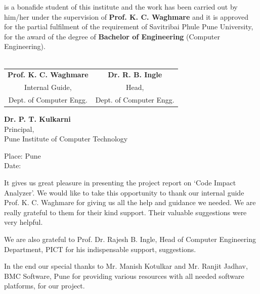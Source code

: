 \documentclass[oneside,a4paper,12pt]{book}
\begin{document}
is a bonafide student of this institute and the work has been carried out by him/her under the supervision of \textbf{Prof. K. C. Waghmare} and it is approved for the partial fulfilment of the requirement of Savitribai Phule Pune University, for the award of the degree of \textbf{Bachelor of Engineering} (Computer Engineering). \\
\\
\vskip 1cm
\bgroup
\def\arraystretch{0.7}
\begin{tabular}{c c }
\textbf{Prof. K. C. Waghmare} &  \hspace{50 mm} \textbf{Dr. R. B. Ingle} \\
Internal Guide,   &  \hspace{50 mm} Head, \\
Dept. of Computer Engg.  &	\hspace{50 mm}Dept. of Computer Engg. \\
\end{tabular}

\begin{center} 
\vspace*{1\baselineskip}
{
\textbf{Dr. P. T. Kulkarni}\\
Principal,\\
Pune Institute of Computer Technology  
}
\end{center}

Place: Pune\\
Date:

{ \setlength{\parindent}{11mm} }
{\setlength{\parindent}{0mm} }

\begin{justify}

It gives us great pleasure in presenting the project report on ‘Code Impact Analyzer’. We would like to take this opportunity to thank our internal guide Prof. K. C. Waghmare for giving us all the help and guidance we needed. We are really grateful to them for their kind support. Their valuable suggestions were very helpful.
\end{justify}\par
\begin{justify}

We are also grateful to Prof. Dr. Rajesh B. Ingle, Head of Computer Engineering Department, PICT for his indispensable support, suggestions.
\end{justify}\par
\begin{justify}

In the end our special thanks to Mr. Manish Kotulkar and Mr. Ranjit Jadhav, BMC Software, Pune for providing various resources with all needed software platforms, for our project.
\end{justify}\par
\end{document}
